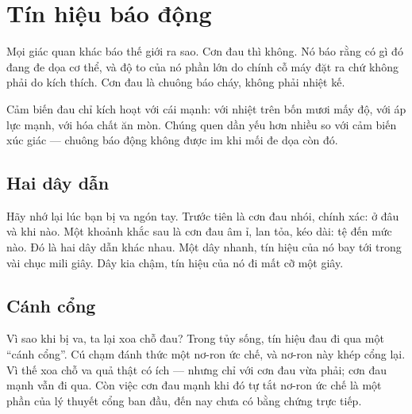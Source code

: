 \chapter{Tín hiệu báo động}


Mọi giác quan khác báo thế giới ra sao. Cơn đau thì không. Nó báo rằng có gì đó đang đe dọa cơ thể, và độ to của nó phần lớn do chính cỗ máy đặt ra chứ không phải do kích thích. Cơn đau là chuông báo cháy, không phải nhiệt kế.

Cảm biến đau chỉ kích hoạt với cái mạnh: với nhiệt trên bốn mươi mấy độ, với áp lực mạnh, với hóa chất ăn mòn. Chúng quen dần yếu hơn nhiều so với cảm biến xúc giác --- chuông báo động không được im khi mối đe dọa còn đó.

\section*{Hai dây dẫn}

Hãy nhớ lại lúc bạn bị va ngón tay. Trước tiên là cơn đau nhói, chính xác: ở đâu và khi nào. Một khoảnh khắc sau là cơn đau âm ỉ, lan tỏa, kéo dài: tệ đến mức nào. Đó là hai dây dẫn khác nhau. Một dây nhanh, tín hiệu của nó bay tới trong vài chục mili giây. Dây kia chậm, tín hiệu của nó đi mất cỡ một giây.

\section*{Cánh cổng}

Vì sao khi bị va, ta lại xoa chỗ đau? Trong tủy sống, tín hiệu đau đi qua một ``cánh cổng''. Cú chạm đánh thức một nơ-ron ức chế, và nơ-ron này khép cổng lại. Vì thế xoa chỗ va quả thật có ích --- nhưng chỉ với cơn đau vừa phải; cơn đau mạnh vẫn đi qua. Còn việc cơn đau mạnh khi đó tự tắt nơ-ron ức chế là một phần của lý thuyết cổng ban đầu, đến nay chưa có bằng chứng trực tiếp.


